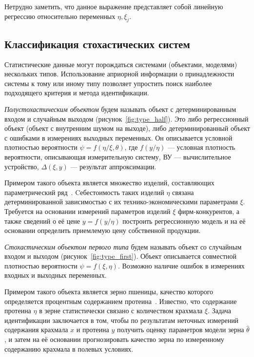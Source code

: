 Нетрудно заметить, что данное выражение представляет собой линейную регрессию относительно
переменных \( \eta, \xi_j \).

\subsection{Классификация стохастических систем}\label{subsec:classification}

Статистические данные могут порождаться системами (объектами, моделями) нескольких типов.
Использование априорной информации о принадлежности системы к тому или иному типу
позволяет упростить поиск наиболее подходящего критерия и метода идентификации.

\emph{Полустохастическим объектом} будем называть объект с детерминированным входом и
случайным выходом (рисунок~\ref{fig:type_half}).
Это либо регрессионный объект (объект с внутренним шумом на выходе),
либо детерминированный объект с ошибками в измерениях выходных переменных.
Он описывается условной плотностью вероятности \( \psi = f(\eta / \xi, \theta) \),
где \( f(y / \eta) \) --- условная плотность вероятности, описывающая измерительную систему,
ВУ --- вычислительное устройство,
\( \Delta(\xi, y) \) --- результат аппроксимации.

Примером такого объекта является множество изделий, составляющих параметрический ряд~\cite{kruchkova02}.
Cебестоимость таких изделий \( \eta \) связана детерминированной зависимостью с
их технико-экономическими параметрами \( \xi \).
Требуется на основании измерений параметров изделий \( \xi \) фирм-конкурентов,
а также сведений о её цене \( y = f(y / \eta) \) построить регрессионную модель и на её основании
определить приемлемую цену собственной продукции.

\emph{Стохастическим объектом первого типа} будем называть объект со случайным входом и выходом
(рисунок~\ref{fig:type_first}).
Объект описывается совместной плотностью вероятности \( \psi = f(\xi, \eta) \).
Возможно наличие ошибок в измерениях входных и выходных переменных.

Примером такого объекта является зерно пшеницы,
качество которого определяется процентным содержанием протеина~\cite{ezekiel41}.
Известно, что содержание протеина \( \eta \) в зерне статистически связано с
количеством крахмала \( \xi \).
Задача идентификации заключается в том, чтобы по результатам неточных измерений содержания
крахмала \( x \) и протеина \( y \) получить оценку параметров модели зерна \( \hat{\theta} \),
и затем на её основании прогнозировать качество зерна по измеренному содержанию крахмала в полевых условиях.

